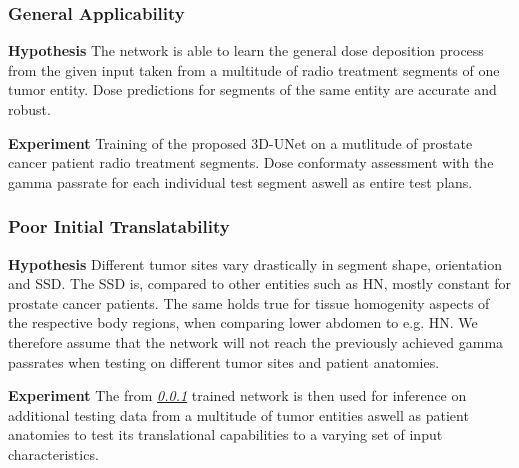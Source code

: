 \subsubsection{General Applicability}\label{sssec:H1}
\begin{hanginglist}\itemsep2pt

    \item\textbf{Hypothesis}\newline
    The network is able to learn the general dose deposition process from the given input taken from a multitude of radio treatment segments of one tumor entity. 
    Dose predictions for segments of the same entity are accurate and robust.

    \item\textbf{Experiment}\newline
    Training of the proposed 3D-UNet on a mutlitude of prostate cancer patient radio treatment segments. 
    Dose conformaty assessment with the gamma passrate for each individual test segment aswell as entire test plans. 

\end{hanginglist}

\subsubsection{Poor Initial Translatability}\label{sssec:H2}
\begin{hanginglist}\itemsep2pt

    \item\textbf{Hypothesis}\newline
    Different tumor sites vary drastically in segment shape, orientation and \ac{SSD}. The \acs{SSD} is, compared to other entities such as \acs{HN}, mostly constant for prostate cancer patients. The same holds true for tissue homogenity aspects of the respective body regions, when comparing lower abdomen to e.g. \acs{HN}. We therefore assume that the network will not reach the previously achieved gamma passrates when testing on different tumor sites and patient anatomies. 

    \item\textbf{Experiment}\newline
    The from \emph{\ref{sssec:H1} } trained network is then used for inference on additional testing data from a multitude of tumor entities aswell as patient anatomies to test its translational capabilities to a varying set of input characteristics. 

\end{hanginglist}

